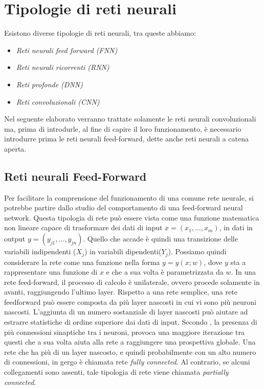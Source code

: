 \section{Tipologie di reti neurali}
Esistono diverse tipologie di reti neurali, tra queste abbiamo:
\begin{itemize}
    \item \emph{Reti neurali feed forward (FNN)}
    \item \emph{Reti neurali ricorrenti (RNN)}
    \item \emph{Reti profonde (DNN)}
    \item \emph{Reti convoluzionali (CNN)}
\end{itemize}
Nel seguente elaborato verranno trattate solamente le reti neurali convoluzionali 
ma, prima di introdurle, al fine di capire il loro funzionamento, è necessario 
introdurre prima le reti neurali feed-forward, dette anche reti neurali a catena 
aperta.

\subsection{Reti neurali Feed-Forward}
Per facilitare la comprensione del funzionamento di una comune rete neurale, 
si potrebbe partire dallo studio del comportamento di una feed-forward neural 
network. Questa tipologia di rete può essere vista come una funzione matematica 
non lineare capace di trasformare dei dati di input $x=(x_1, \dots, x_m)$, in dati in 
output $y=(y_{j1}, \dots, y_{jn})$. Quello che accade è quindi una transizione delle variabili 
indipendenti ($X_j$) in variabili dipendenti($Y_j$). Possiamo quindi considerare la 
rete come una funzione nella forma $y = y(x;w)$, dove $y$ sta a rappresentare una funzione di $x$ 
e che a sua volta è parametrizzata da $w$. In una rete feed-forward, il 
processo di calcolo è unilaterale, ovvero procede solamente in avanti, raggiungendo 
l’ultimo layer. Rispetto a una rete semplice, una rete feedforward può essere 
composta da più layer nascosti in cui vi sono più neuroni nascosti. L’aggiunta 
di un numero sostanziale di layer nascosti può aiutare ad estrarre statistiche di 
ordine superiore dai dati di input. Secondo \cite{04}, la presenza di più connessioni 
sinaptiche tra i neuroni, provoca una maggiore iterazione tra questi che a sua 
volta aiuta alla rete a raggiungere una prospettiva globale. Una rete che ha più di 
un layer nascosto, e quindi probabilmente con un alto numero di connessioni, in 
gergo è chiamata rete \emph{fully connected}. Al contrario, se alcuni collegamenti sono 
assenti, tale tipologia di rete viene chiamata \emph{partially connected}.

